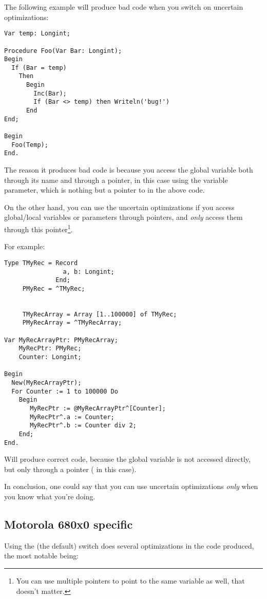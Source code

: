 \begin{enumerate}
The following example will produce bad code when you switch on
uncertain optimizations:
\begin{verbatim}
Var temp: Longint;

Procedure Foo(Var Bar: Longint);
Begin
  If (Bar = temp)
    Then
      Begin
        Inc(Bar);
        If (Bar <> temp) then Writeln('bug!')
      End
End;

Begin
  Foo(Temp);
End.
\end{verbatim}
The reason it produces bad code is because you access the global variable
 both through its name  and through a pointer, in this
case using the  variable parameter, which is nothing but a pointer
to  in the above code.

On the other hand, you can use the uncertain optimizations if
you access global/local variables or parameters through pointers,
and {\em only} access them through this pointer\footnote{
You can use multiple pointers to point to the same variable as well, that
doesn't matter.}.

For example:
\begin{verbatim}
Type TMyRec = Record
                a, b: Longint;
              End;
     PMyRec = ^TMyRec;


     TMyRecArray = Array [1..100000] of TMyRec;
     PMyRecArray = ^TMyRecArray;

Var MyRecArrayPtr: PMyRecArray;
    MyRecPtr: PMyRec;
    Counter: Longint;

Begin
  New(MyRecArrayPtr);
  For Counter := 1 to 100000 Do
    Begin
       MyRecPtr := @MyRecArrayPtr^[Counter];
       MyRecPtr^.a := Counter;
       MyRecPtr^.b := Counter div 2;
    End;
End.
\end{verbatim}
Will produce correct code, because the global variable 
is not accessed directly, but only through a pointer ( in this
case).

In conclusion, one could say that you can use uncertain optimizations {\em
only} when you know what you're doing.
\end{enumerate}

\subsection{Motorola 680x0 specific}

Using the  (the default) switch does several optimizations 
in the code produced, the most notable being:

